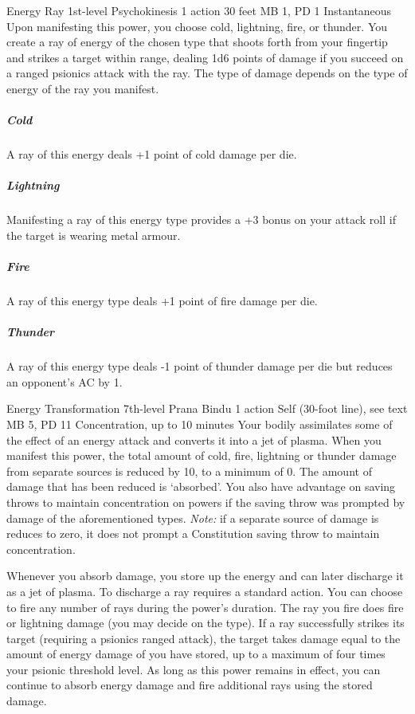 \DndPowerHeader%
  {Energy Ray}
  {1st-level Psychokinesis}
  {1 action}
  {30 feet}
  {MB 1, PD 1}
  {Instantaneous}
Upon manifesting this power,
you choose cold, lightning, fire, or thunder.
You create a ray of energy of the chosen type that
shoots forth from your fingertip and strikes a target within range,
dealing 1d6 points of damage if you succeed on a
ranged psionics attack with the ray.
The type of damage depends on
the type of energy of the ray you manifest. 
  \subparagraph{Cold}
    A ray of this energy deals +1 point of cold damage per die.
  \subparagraph{Lightning}
    Manifesting a ray of this energy type provides a
    +3 bonus on your attack roll if the target is wearing metal armour.
  \subparagraph{Fire}
    A ray of this energy type deals +1 point of fire damage per die.
  \subparagraph{Thunder}
    A ray of this energy type deals -1 point of thunder damage per die
    but reduces an opponent's AC by 1.

\DndPowerHeader%
  {Energy Transformation}
  {7th-level Prana Bindu}
  {1 action}
  {Self (30-foot line), see text}
  {MB 5, PD 11}
  {Concentration, up to 10 minutes}
  Your bodily assimilates some of the effect of an
  energy attack and converts it into a jet of plasma.
  When you manifest this power,
  the total amount of cold, fire,
  lightning or thunder damage
  from separate sources is reduced by 10,
  to a minimum of 0.
  The amount of damage that has been reduced
  is `absorbed'.
  You also have advantage on saving throws to
  maintain concentration on powers if the
  saving throw was prompted by damage of the
  aforementioned types.
  \emph{Note:} if a separate source of damage is
  reduces to zero, it does not prompt a Constitution
  saving throw to maintain concentration.
  
  Whenever you absorb damage,
  you store up the energy and can later discharge it
  as a jet of plasma.
  To discharge a ray requires a standard action.
  You can choose to fire any number of rays
  during the power's duration.
  The ray you fire does fire or lightning damage
  (you may decide on the type).
  If a ray successfully strikes its target
  (requiring a psionics ranged attack),
  the target takes damage equal to the amount of energy damage
  of you have stored,
  up to a maximum of four times your psionic threshold level.
  As long as this power remains in effect,
  you can continue to absorb energy damage and
  fire additional rays using the stored damage.

